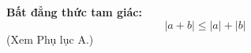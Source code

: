 \noindent
\begin{minipage}[t][\textheight][t]{46mm}
    \vspace*{490pt}
    \begin{flushleft}
    \fontsize{8.5pt}{12pt}\selectfont
    \textbf{\textsf{Bất đẳng thức tam giác:}}
    \vspace{-0.4em}
    \[
    |a + b| \leqslant |a| + |b|
    \]
    \vspace{-0.6em}
    \textsf{\color{stewartdarkgray}(Xem Phụ lục A.)}
    \end{flushleft}
\end{minipage}%
\hspace{8mm}%
